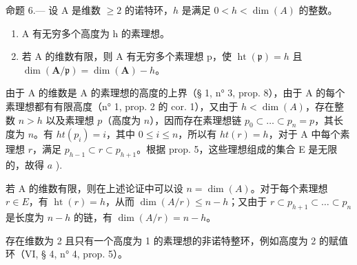 命题 6.--- 设 A 是维数 \(\geqslant 2\) 的诺特环，\(h\) 是满足 \(0 < h < \dim(A)\) 的整数。

\begin{enumerate}
\def\labelenumi{\alph{enumi})}
\item
  A 有无穷多个高度为 h 的素理想。
\item
  若 A 的维数有限，则 A 有无穷多个素理想 p，使 \(\operatorname{ht}(\mathfrak{p}) = h\) 且 \(\dim(\mathbf{A}/\mathfrak{p}) = \dim(\mathbf{A}) - h\)。
\end{enumerate}

由于 A 的维数是 A 的素理想的高度的上界（§ 1, n° 3, prop. 8），由于 A 的每个素理想都有有限高度（n° 1, prop. 2 的 cor. 1），又由于 \(h < \dim(A)\)，存在整数 \(n > h\) 以及素理想 \(p\)（高度为 \(n\)），因而存在素理想链 \(p_0 \subset \ldots \subset p_n = p\)，其长度为 \(n\)。有 \(ht(p_i) = i\)，其中 \(0 \leqslant i \leqslant n\)，所以有 \(ht(r) = h\)，对于 A 中每个素理想 \(r\)，满足 \(p_{h-1} \subset r \subset p_{h+1}\)。根据 prop. 5，这些理想组成的集合 E 是无限的，故得 \(a\) ).

若 A 的维数有限，则在上述论证中可以设 \(n = \dim(A)\)。对于每个素理想 \(r \in E\)，有 \(\operatorname{ht}(r) = h\)，从而 \(\dim(A/r) \leqslant n - h\)；又由于 \(r \subset p_{h+1} \subset \ldots \subset p_n\) 是长度为 \(n - h\) 的链，有 \(\dim(A/r) = n - h\)。

存在维数为 2 且只有一个高度为 1 的素理想的非诺特整环，例如高度为 2 的赋值环（VI, § 4, n° 4, prop. 5）。

